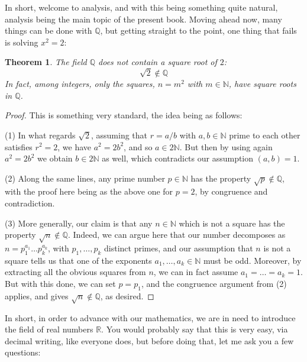 \documentclass[12pt]{amsbook}
\newtheorem{theorem}{Theorem}[chapter]
\begin{document}
In short, welcome to analysis, and with this being something quite natural, analysis being the main topic of the present book. Moving ahead now, many things can be done with $\mathbb Q$, but getting straight to the point, one thing that fails is solving $x^2=2$:


\begin{theorem}
The field $\mathbb Q$ does not contain a square root of $2$:
$$\sqrt{2}\notin\mathbb Q$$
In fact, among integers, only the squares, $n=m^2$ with $m\in\mathbb N$, have square roots in $\mathbb Q$.
\end{theorem}

\begin{proof}
This is something very standard, the idea being as follows:

\medskip

(1) In what regards $\sqrt{2}$, assuming that $r=a/b$ with $a,b\in\mathbb N$ prime to each other satisfies $r^2=2$, we have $a^2=2b^2$, and so $a\in2\mathbb N$. But then by using again $a^2=2b^2$ we obtain $b\in2\mathbb N$ as well, which contradicts our assumption $(a,b)=1$.

\medskip

(2) Along the same lines, any prime number $p\in\mathbb N$ has the property $\sqrt{p}\notin\mathbb Q$, with the proof here being as the above one for $p=2$, by congruence and contradiction.

\medskip

(3) More generally, our claim is that any $n\in\mathbb N$ which is not a square has the property $\sqrt{n}\notin\mathbb Q$. Indeed, we can argue here that our number decomposes as $n=p_1^{a_1}\ldots p_k^{a_k}$, with $p_1,\ldots,p_k$ distinct primes, and our assumption that $n$ is not a square tells us that one of the exponents $a_1,\ldots,a_k\in\mathbb N$ must be odd. Moreover, by extracting all the obvious squares from $n$, we can in fact assume $a_1=\ldots=a_k=1$. But with this done, we can set $p=p_1$, and the congruence argument from (2) applies, and gives $\sqrt{n}\notin\mathbb Q$, as desired. 
\end{proof}

In short, in order to advance with our mathematics, we are in need to introduce the field of real numbers $\mathbb R$. You would probably say that this is very easy, via decimal writing, like everyone does, but before doing that, let me ask you a few questions:

\bigskip
\end{document}
